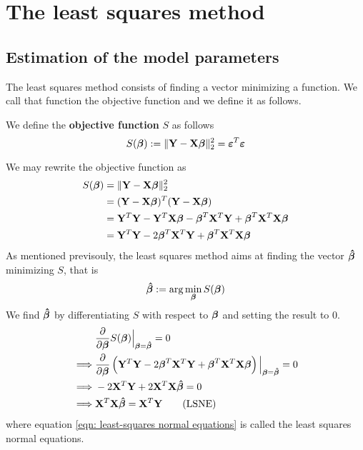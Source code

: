 \section{The least squares method}
\subsection{Estimation of the model parameters}

The least squares method consists of finding a vector minimizing a function. We call that function the objective function and we define it as follows.

\begin{definition}
    We define the \textbf{objective function} \( S \) as follows
    \begin{equation}
        \label{eqn: least squares objective function}
        S(\boldsymbol{\beta}) := \| \mathbf{Y}-\mathbf{X} \boldsymbol{\beta} \|_2^2 = \boldsymbol{\varepsilon}^{T} \boldsymbol{\varepsilon}
    \end{equation}
\end{definition}
We may rewrite the objective function as
\begin{align*}
    S(\boldsymbol{\beta})
     & = \| \mathbf{Y}-\mathbf{X} \boldsymbol{\beta} \|_2^2                                          \\
     & = (\mathbf{Y} - \mathbf{X} \boldsymbol{\beta})^{T} (\mathbf{Y} - \mathbf{X} \boldsymbol{\beta})                             \\
     & = \mathbf{Y}^T \mathbf{Y} - \mathbf{Y}^T \mathbf{X} \boldsymbol{\beta} - \boldsymbol{\beta}^T \mathbf{X}^T \mathbf{Y} + \boldsymbol{\beta}^T \mathbf{X}^T \mathbf{X} \boldsymbol{\beta} \\
     & = \mathbf{Y}^T \mathbf{Y} - 2 \boldsymbol{\beta}^T \mathbf{X}^T \mathbf{Y} + \boldsymbol{\beta}^T \mathbf{X}^T \mathbf{X} \boldsymbol{\beta}              \\
\end{align*}
As mentioned previsouly, the least squares method aims at finding the vector $\boldsymbol{\hat{\beta}}$ minimizing \( S \), that is
\[
    \boldsymbol{\hat{\beta}} := \arg \min_{\boldsymbol{\beta}} S(\boldsymbol{\beta})
\]
We find \( \boldsymbol{\hat{\beta}} \) by differentiating \( S \) with respect to $\boldsymbol{\beta}$ and setting the result to 0.
\begin{align}
             & \frac{\partial}{\partial \boldsymbol{\beta}} S(\boldsymbol{\beta}) \Big|_{\boldsymbol{\beta} = \boldsymbol{\hat{\beta}}} = 0 \nonumber                                                        \\
    \implies & \frac{\partial}{\partial \boldsymbol{\beta}} \left( \mathbf{Y}^T \mathbf{Y} - 2 \boldsymbol{\beta}^T \mathbf{X}^T \mathbf{Y} + \boldsymbol{\beta}^T \mathbf{X}^T \mathbf{X} \boldsymbol{\beta} \right)\Big|_{\boldsymbol{\beta} = \boldsymbol{\hat{\beta}}} = 0 \nonumber \\
    \implies & - 2 \mathbf{X}^T \mathbf{Y} + 2 \mathbf{X}^T \mathbf{X} \boldsymbol{\hat{\beta}} = 0 \nonumber                                                                                      \\
    \implies & \mathbf{X}^T \mathbf{X} \boldsymbol{\hat{\beta}} = \mathbf{X}^T \mathbf{Y} \label{eqn: least-squares normal equations} \tag{LSNE}
\end{align}
where equation \eqref{eqn: least-squares normal equations} is called the least squares normal equations.

